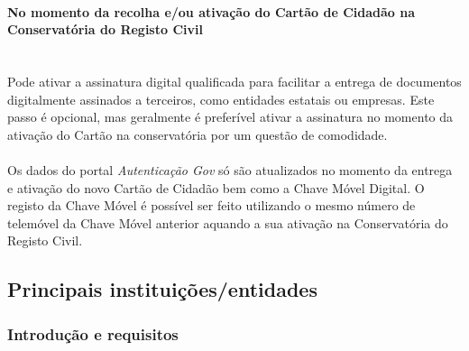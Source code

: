 \paragraph{No momento da recolha e/ou ativação do Cartão de Cidadão	na Conservatória do Registo	Civil}
\leavevmode\\[4pt]
Pode ativar a assinatura digital qualificada para facilitar a entrega de
documentos digitalmente assinados a terceiros, como entidades estatais
ou empresas. Este passo é opcional, mas geralmente é preferível ativar a
assinatura no momento da ativação do Cartão na conservatória por um
questão de comodidade. \\
\\
Os dados do portal \emph{Autenticação Gov} só são atualizados no momento
da entrega e ativação do novo Cartão de Cidadão bem como a Chave Móvel
Digital. O registo da Chave Móvel é possível ser feito utilizando o
mesmo número de telemóvel da Chave Móvel anterior aquando a sua ativação
na Conservatória do Registo Civil.

\subsection{Principais instituições/entidades}

\subsubsection{Introdução e	requisitos}

